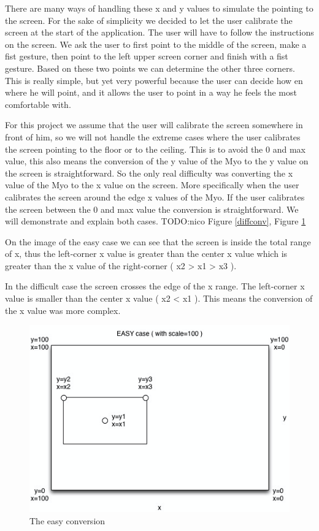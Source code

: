 \documentclass{article}
\begin{document}
There are many ways of handling these x and y values to simulate the pointing to the screen. For the sake of simplicity we decided to let the user calibrate the screen at the start of the application. The user will have to follow the instructions on the screen. We ask the user to first point to the middle of the screen, make a fist gesture, then point to the left upper screen corner and finish with a fist gesture. Based on these two points we can determine the other three corners.  This is really simple, but yet very powerful because the user can decide how en where he will point, and it allows the user to point in a way he feels the most comfortable with.

For this project we assume that the user will calibrate the screen somewhere in front of him, so we will not handle the extreme cases where the user calibrates the screen pointing to the floor or to the ceiling. This is to avoid the 0 and max value, this also means the conversion of the y value of the Myo to the y value on the screen is straightforward. So the only real difficulty was converting the x value of the Myo to the x value on the screen. More specifically when the user calibrates the screen around the edge x values of the Myo. If the user calibrates the screen between the 0 and max value the conversion is straightforward. We will demonstrate and explain both cases. TODO:nico Figure \ref{diffconv}, Figure \ref{easyconv}

On the image of the easy case we can see that the screen is inside the total range of x, thus the left-corner x value is greater than the center x value which is greater than the x value of the right-corner ( x2 > x1 > x3 ).

In the difficult case the screen crosses the edge of the x range. The left-corner x value is smaller than the center x value ( x2 < x1 ). This means the conversion of the x value was more complex.

\begin{figure}[!ht]
  \centering
      \centerline{\includegraphics[width=1\textwidth]{Images/easy-conversion.png}}
  \caption{The easy conversion}
	\label{easyconv}
\end{figure}
\end{document}
